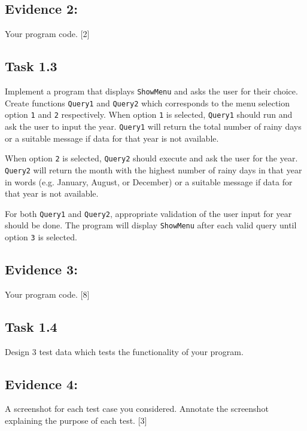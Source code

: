 \subsection*{Evidence 2: }

Your program code.\hfill{} {[}2{]}

\subsection*{Task 1.3 }

Implement a program that displays \texttt{ShowMenu} and asks the user
for their choice. Create functions \texttt{Query1} and \texttt{Query2}
which corresponds to the menu selection option \texttt{1} and \texttt{2}
respectively. When option \texttt{1} is selected, \texttt{Query1}
should run and ask the user to input the year. \texttt{Query1} will
return the total number of rainy days or a suitable message if data
for that year is not available. 

When option \texttt{2} is selected, \texttt{Query2} should execute
and ask the user for the year. \texttt{Query2} will return the month
with the highest number of rainy days in that year in words (e.g.
January, August, or December) or a suitable message if data for that
year is not available. 

For both \texttt{Query1} and \texttt{Query2}, appropriate validation
of the user input for year should be done. The program will display
\texttt{ShowMenu} after each valid query until option \texttt{3} is
selected.

\subsection*{Evidence 3: }

Your program code. \hfill{}{[}8{]}

\subsection*{Task 1.4 }

Design 3 test data which tests the functionality of your program. 

\subsection*{Evidence 4: }

A screenshot for each test case you considered. Annotate the screenshot
explaining the purpose of each test. \hfill{}{[}3{]}